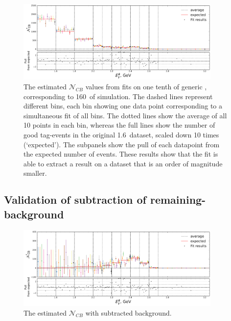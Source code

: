 \begin{figure}[htbp!]
    \includegraphics[width=0.9\textwidth]{figures/mc_validation/extracted_signal_generic_mc.pdf}
    \caption{\label{fig:extracted_validation_mc}The estimated $\mathcal{N}_{CB}$ values from fits on one tenth of generic \MC, corresponding to 160~\invfb of simulation.
    The dashed lines represent different \EB bins, each bin showing one data point corresponding to a simultaneous fit of all \EB bins.
    The dotted lines show the average of all 10 points in each bin, whereas the full lines show the number of good tag-\B events in the original 1.6~\invab dataset, scaled down 10 times (`expected').
    The subpanels show the pull of each datapoint from the expected number of events.
    These results show that the fit is able to extract a result on a dataset that is an order of magnitude smaller.
    }
\end{figure}

\subsection{Validation of subtraction of remaining-\texorpdfstring{\BB}{BB} background}\label{sec:background_subtraction_validation_mc}

\begin{figure}[htbp!]
    \includegraphics[width=0.9\textwidth]{figures/mc_validation/subtracted_signal_generic_mc.pdf}
    \caption{\label{fig:subtracted_validation_mc}
    The estimated $\mathcal{N}_{CB}$ with subtracted background.
    }
\end{figure}
